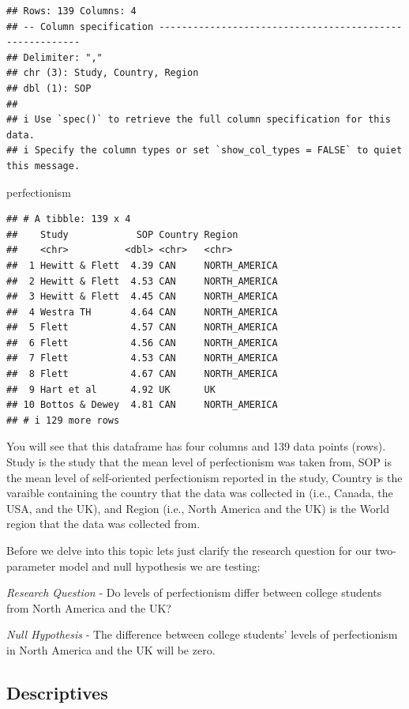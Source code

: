 \documentclass[
]{article}
\newenvironment{Shaded}{\begin{snugshade}}{\end{snugshade}}
\newcommand{\NormalTok}[1]{#1}
\begin{document}
\begin{verbatim}
## Rows: 139 Columns: 4
## -- Column specification --------------------------------------------------------
## Delimiter: ","
## chr (3): Study, Country, Region
## dbl (1): SOP
## 
## i Use `spec()` to retrieve the full column specification for this data.
## i Specify the column types or set `show_col_types = FALSE` to quiet this message.
\end{verbatim}

\begin{Shaded}
\begin{Highlighting}[]
\NormalTok{perfectionism}
\end{Highlighting}
\end{Shaded}

\begin{verbatim}
## # A tibble: 139 x 4
##    Study            SOP Country Region       
##    <chr>          <dbl> <chr>   <chr>        
##  1 Hewitt & Flett  4.39 CAN     NORTH_AMERICA
##  2 Hewitt & Flett  4.53 CAN     NORTH_AMERICA
##  3 Hewitt & Flett  4.45 CAN     NORTH_AMERICA
##  4 Westra TH       4.64 CAN     NORTH_AMERICA
##  5 Flett           4.57 CAN     NORTH_AMERICA
##  6 Flett           4.56 CAN     NORTH_AMERICA
##  7 Flett           4.53 CAN     NORTH_AMERICA
##  8 Flett           4.67 CAN     NORTH_AMERICA
##  9 Hart et al      4.92 UK      UK           
## 10 Bottos & Dewey  4.81 CAN     NORTH_AMERICA
## # i 129 more rows
\end{verbatim}

You will see that this dataframe has four columns and 139 data points
(rows). Study is the study that the mean level of perfectionism was
taken from, SOP is the mean level of self-oriented perfectionism
reported in the study, Country is the varaible containing the country
that the data was collected in (i.e., Canada, the USA, and the UK), and
Region (i.e., North America and the UK) is the World region that the
data was collected from.

Before we delve into this topic lets just clarify the research question
for our two-parameter model and null hypothesis we are testing:

\emph{Research Question} - Do levels of perfectionism differ between
college students from North America and the UK?

\emph{Null Hypothesis} - The difference between college students' levels
of perfectionism in North America and the UK will be zero.

\subsection{Descriptives}\label{descriptives-1}
\end{document}
